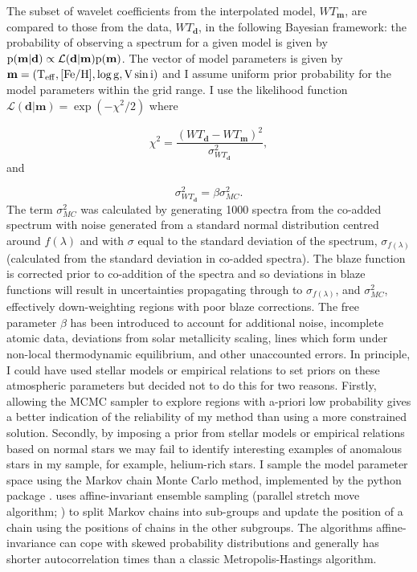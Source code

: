 The subset of wavelet coefficients from the interpolated model, $WT_{\textbf{m}}$, are compared to those from the data, $WT_{\textbf{d}}$, in the following Bayesian framework: the probability of observing a spectrum for a given model is given by $\rm p(\textbf{m}|\textbf{d})\propto \mathcal{L}(\textbf{d}|\textbf{m}) \rm p(\textbf{m})$. The vector of model parameters  is given by $\rm \textbf{m} = \left( \rm T_{\rm eff}, \rm [Fe/H], \log g, \rm V \sin i \right)$ and I assume uniform prior probability for the model parameters within the grid range. I use the likelihood function $\mathcal{L}(\textbf{d}|\textbf{m}) = \exp (-\chi^2/2)$ where

\begin{equation}\label{chi_squared}
\chi^{2} = \frac{(WT_{\textbf{d}} - WT_{\textbf{m}})^{2}}{\sigma_{WT_{\textbf{d}}}^2}
,\end{equation}
and 

\begin{equation}\label{sigma}
\sigma_{WT_{\textbf{d}}}^2 = \beta \sigma_{MC}^{2}.
\end{equation}
The term $\sigma_{MC}^{2}$ was calculated by generating 1000 spectra from the co-added spectrum with noise generated from a standard normal distribution centred around $f(\lambda)$ and with $\sigma$ equal to the standard deviation of the spectrum, $\sigma_{f(\lambda)}$ (calculated from the standard deviation in co-added spectra). The blaze function is corrected prior to co-addition of the spectra and so deviations in blaze functions will result in uncertainties propagating through to $\sigma_{f(\lambda)}$, and $\sigma_{MC}^{2}$, effectively down-weighting regions with poor blaze corrections.  The free parameter $\beta$ has been introduced to account for additional noise, incomplete atomic data, deviations from solar metallicity scaling, lines which form under non-local thermodynamic equilibrium, and other unaccounted errors. In principle, I could have used stellar models or empirical relations to set priors on these atmospheric parameters but decided not to do this for two reasons. Firstly, allowing the MCMC sampler to explore regions with a-priori low probability gives a better indication of the reliability of my method than using a more constrained solution. Secondly, by imposing a prior from stellar models or empirical relations based on normal stars we may fail to identify interesting examples of anomalous stars in my sample, for example, helium-rich stars. 
I sample the model parameter space using the Markov chain Monte Carlo method, implemented by the python package {} \citep{2013PASP..125..306F} . {} uses affine-invariant ensemble sampling (parallel stretch move algorithm; \citealt{Goodman2010}) to split Markov chains into sub-groups and update the position of a chain using the positions of chains in the other subgroups. The algorithms affine-invariance can cope with skewed probability distributions and generally has shorter autocorrelation times than a classic Metropolis-Hastings algorithm.

